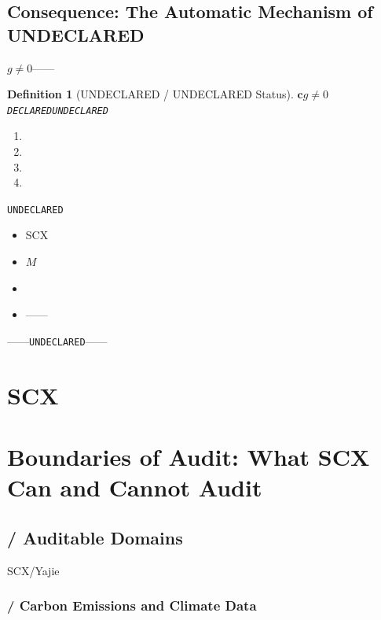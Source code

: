 \documentclass[12pt,a4paper]{article}
\newtheorem{definition}[theorem]{Definition}
\theoremstyle{remark}
\newcommand{\UNDECLARED}{\texttt{UNDECLARED}}
\newcommand{\DECLARED}{\texttt{DECLARED}}
\begin{document}
\subsection{Consequence: The Automatic Mechanism of UNDECLARED}

$g \neq 0$——\textbf{}

\begin{definition}[UNDECLARED / UNDECLARED Status]
    $\mathbf{c}$$g \neq 0$\DECLARED{}\UNDECLARED
    \begin{enumerate}[label=(\arabic*)]
        \item 
        \item 
        \item 
        \item 
    \end{enumerate}
    \textbf{}
\end{definition}

\UNDECLARED{}

\begin{itemize}[nosep]
    \item SCX
    \item $M$
    \item 
    \item ——
\end{itemize}

\textbf{}——\UNDECLARED{}——


\section{SCX}
\section{Boundaries of Audit: What SCX Can and Cannot Audit}

\subsection{ / Auditable Domains}

SCX/Yajie\textbf{}

\subsubsection{ / Carbon Emissions and Climate Data}
\end{document}
